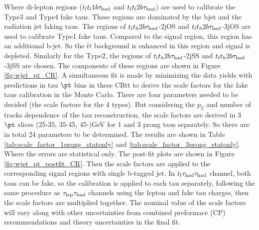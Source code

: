 %
%

Where di-lepton regions ($t_lt_l1b\tau_\text{had}$ and $t_lt_l2b\tau_\text{had}$) are used to calibrate the Type3 and Type4 fake taus. These regions are dominated by the bjet and the radiation jet faking taus. The regions of
$t_lt_h2b\tau_\text{had}$-2jOS and $t_lt_h2b\tau_\text{had}$-3jOS are used to calibrate Type1 fake taus. Compared to the signal region, this region has an additional b-jet. So the $\bar{t}t$ background is enhanced in this region and signal is depleted. Similarly for the Type2, the regions of $t_lt_h2b\tau_\text{had}$-2jSS and $t_lt_h2b\tau_\text{had}$-3jSS are chosen. The components of these regions are shown in Figure \ref{fig:wjet_pt_CR}. 
A simultaneous fit is made by minimizing the data yields with predictions in tau $\pt$ bins in these CRtt to derive the scale factors for the fake taus calibration in the Monte Carlo.
There are four parameters needed to be decided (the scale factors for the 4 types). But considering the $p_{T}$ and number of tracks dependence of the tau reconstruction, the scale factors are derived in 3 $\pt$ slices (25-35, 35-45, 45-)GeV for 1 and 3 prong taus separately. So there are in total 24 parameters to be determined. The results are shown in Table \ref{tab:scale_factor_1prong_statonly} and \ref{tab:scale_factor_3prong_statonly}. Where the errors are statistical only. The post-fit plots are shown in Figure \ref{fig:wjet_pt_postfit_CR}. Then the scale factors are applied to the corresponding signal regions with single b-tagged jet. In $t_l\tau_\text{had}{}\tau_\text{had}$ channel, both taus can be fake, so the calibration is applied to each tau separately, following the same procedure as $\tau_\text{lep}{}\tau_\text{had}$ channels using the lepton and fake tau charges, then the scale factors are multiplied together. The nominal value of the scale factors will vary along with other uncertainties from combined preformace (CP) recommendations and theory uncertainties in the final fit.




